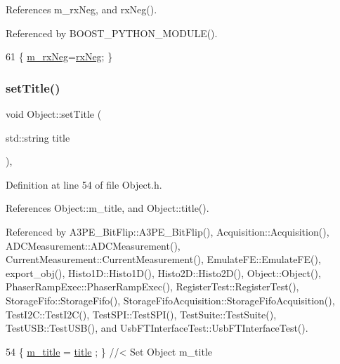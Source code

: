 References m\+\_\+rx\+Neg, and rx\+Neg().



Referenced by B\+O\+O\+S\+T\+\_\+\+P\+Y\+T\+H\+O\+N\+\_\+\+M\+O\+D\+U\+L\+E().


\begin{DoxyCode}
61 \{ \hyperlink{classUsbSpiBus_abf36f2df24c3ec5363efe73c9771bbc8}{m\_rxNeg}=\hyperlink{classUsbSpiBus_ab24f6e85697305b26997b8dec3f18254}{rxNeg}; \}
\end{DoxyCode}
\mbox{\label{classObject_a89557dbbad5bcaa02652f5d7fa35d20f}} 
\subsubsection{\texorpdfstring{set\+Title()}{setTitle()}}
{\footnotesize\ttfamily void Object\+::set\+Title (\begin{DoxyParamCaption}\item[{std\+::string}]{title }\end{DoxyParamCaption})\hspace{0.3cm}{\ttfamily [inline]}, {\ttfamily [inherited]}}



Definition at line 54 of file Object.\+h.



References Object\+::m\+\_\+title, and Object\+::title().



Referenced by A3\+P\+E\+\_\+\+Bit\+Flip\+::\+A3\+P\+E\+\_\+\+Bit\+Flip(), Acquisition\+::\+Acquisition(), A\+D\+C\+Measurement\+::\+A\+D\+C\+Measurement(), Current\+Measurement\+::\+Current\+Measurement(), Emulate\+F\+E\+::\+Emulate\+F\+E(), export\+\_\+obj(), Histo1\+D\+::\+Histo1\+D(), Histo2\+D\+::\+Histo2\+D(), Object\+::\+Object(), Phaser\+Ramp\+Exec\+::\+Phaser\+Ramp\+Exec(), Register\+Test\+::\+Register\+Test(), Storage\+Fifo\+::\+Storage\+Fifo(), Storage\+Fifo\+Acquisition\+::\+Storage\+Fifo\+Acquisition(), Test\+I2\+C\+::\+Test\+I2\+C(), Test\+S\+P\+I\+::\+Test\+S\+P\+I(), Test\+Suite\+::\+Test\+Suite(), Test\+U\+S\+B\+::\+Test\+U\+S\+B(), and Usb\+F\+T\+Interface\+Test\+::\+Usb\+F\+T\+Interface\+Test().


\begin{DoxyCode}
54 \{ \hyperlink{classObject_affbeea1953eb5163573b92fad8f75727}{m\_title} = \hyperlink{classObject_a73a0f1a41828fdd8303dd662446fb6c3}{title} ; \} \textcolor{comment}{//< Set Object m\_title}
\end{DoxyCode}
\mbox{\label{classUsbSpiBus_a6b15114d79e0d8002ba42f0301ff22a1}} 
